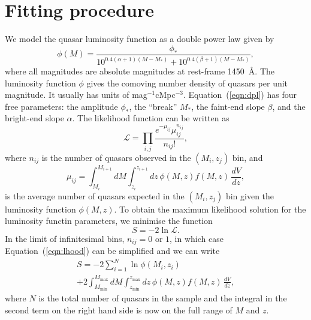 \documentclass[a4paper,fleqn,usenatbib]{mnras}
\begin{document}

  \section{Fitting procedure}

  We model the quasar luminosity function as a double power law given
  by \citep{1988MNRAS.235..935B, 1995ApJ...438..623P, 2000MNRAS.317.1014B}
  \begin{equation}
    \phi(M) = \frac{\phi_*}{10^{0.4(\alpha+1)(M-M_*)}+10^{0.4(\beta+1)(M-M_*)}},
\label{eqn:dpl}
\end{equation}
where all magnitudes are absolute magnitudes at rest-frame 1450~{\AA}.  
The luminosity function $\phi$ gives the comoving number density of
quasars per unit magnitude.  It usually has units of
mag$^{-1}$cMpc$^{-3}$.  Equation~(\ref{eqn:dpl}) has four free
parameters: the amplitude $\phi_*$, the ``break'' $M_*$, the faint-end
slope $\beta$, and the bright-end slope $\alpha$.  The likelihood
function can be written as \citep{2001AJ....121...54F}
\begin{equation}
  \mathcal{L}=\prod_{i,j}\frac{e^{-\mu_{ij}}\mu_{ij}^{n_{ij}}}{n_{ij}!},
  \label{eqn:lhood}
\end{equation}
where $n_{ij}$ is the number of quasars observed in the $(M_i, z_j)$
bin, and
\begin{equation}
  \mu_{ij}= \int_{M_i}^{M_{i+1}}dM\int_{z_i}^{z_{i+1}}dz\, \phi(M,z) f(M, z)\,\frac{dV}{dz},
\end{equation}
is the average number of quasars expected in the $(M_i, z_j)$ bin
given the luminosity function $\phi(M,z)$.  To obtain the maximum
likelihood solution for the luminosity functin parameters, we minimise
the function
\begin{equation}
  S = -2\ln\mathcal{L}.
\end{equation}
In the limit of infinitesimal bins, $n_{ij}=0$ or $1$, in which case
Equation~(\ref{eqn:lhood}) can be simplified and we can write \citep{1983ApJ...269...35M}
\begin{multline}
  S = -2\sum_{i=1}^N\ln\phi(M_i, z_i)\\+2\int_{M_\mathrm{min}}^{M_\mathrm{max}}dM\int_{z_\mathrm{min}}^{z_\mathrm{max}}dz\, \phi(M,z) f(M, z)\,\frac{dV}{dz},
\end{multline}
where $N$ is the total number of quasars in the sample and the
integral in the second term on the right hand side is now on the full
range of $M$ and $z$.
\end{document}
